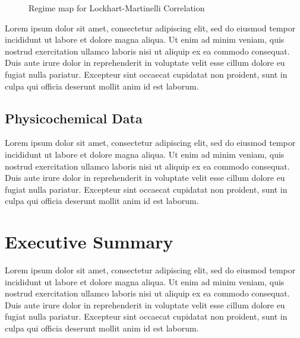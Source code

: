\documentclass[a4paper,12pt]{report}
\begin{document}
\begin{figure}[h]
    \centering
    \caption{Regime map for Lockhart-Martinelli Correlation}
\end{figure}

Lorem ipsum dolor sit amet, consectetur adipiscing elit, sed do eiusmod tempor incididunt ut labore et dolore magna aliqua. Ut enim ad minim veniam, quis nostrud exercitation ullamco laboris nisi ut aliquip ex ea commodo consequat. Duis aute irure dolor in reprehenderit in voluptate velit esse cillum dolore eu fugiat nulla pariatur. Excepteur sint occaecat cupidatat non proident, sunt in culpa qui officia deserunt mollit anim id est laborum.

\subsection{Physicochemical Data}
Lorem ipsum dolor sit amet, consectetur adipiscing elit, sed do eiusmod tempor incididunt ut labore et dolore magna aliqua. Ut enim ad minim veniam, quis nostrud exercitation ullamco laboris nisi ut aliquip ex ea commodo consequat. Duis aute irure dolor in reprehenderit in voluptate velit esse cillum dolore eu fugiat nulla pariatur. Excepteur sint occaecat cupidatat non proident, sunt in culpa qui officia deserunt mollit anim id est laborum.
\newpage

\section[Executive Summary]{Executive Summary}
Lorem ipsum dolor sit amet, consectetur adipiscing elit, sed do eiusmod tempor incididunt ut labore et dolore magna aliqua. Ut enim ad minim veniam, quis nostrud exercitation ullamco laboris nisi ut aliquip ex ea commodo consequat. Duis aute irure dolor in reprehenderit in voluptate velit esse cillum dolore eu fugiat nulla pariatur. Excepteur sint occaecat cupidatat non proident, sunt in culpa qui officia deserunt mollit anim id est laborum.
\end{document}

